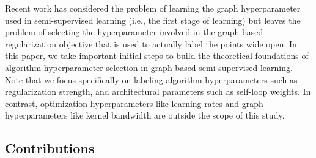 Recent work has considered the problem of learning the graph hyperparameter used in semi-supervised learning (i.e., the first stage of learning) \citep{balcan2021data,fatemi2021slaps} but leaves the problem of selecting the hyperparameter involved in the graph-based regularization objective that is used to actually label the points wide open.
In this paper, we take important initial steps to build the theoretical foundations of algorithm hyperparameter selection in graph-based semi-supervised learning. 
Note that we focus specifically on labeling algorithm hyperparameters such as regularization strength, and architectural parameters such as self-loop weights. In contrast, optimization hyperparameters like learning rates and graph hyperparameters like kernel bandwidth are outside the scope of this study.


\subsection{Contributions}


